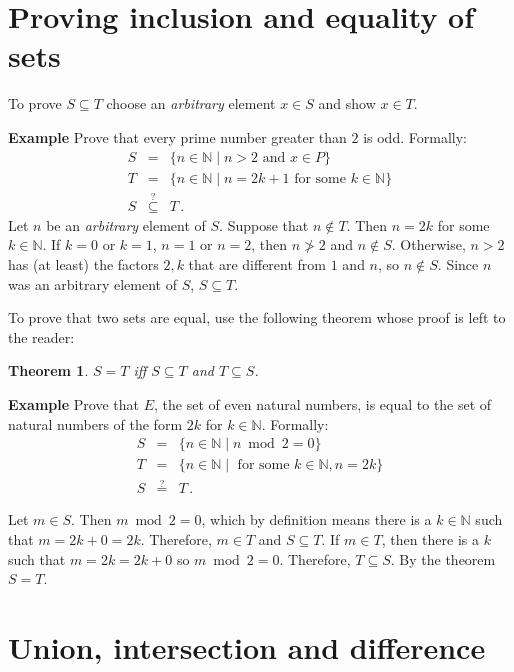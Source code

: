 \documentclass[12pt,a4paper]{article}
\newtheorem{theorem}{Theorem}
\newcommand*{\ind}{\hspace*{2em}}
\newenvironment{example}{\textbf{Example}}{}
\begin{document}
\section{Proving inclusion and equality of sets}

To prove $S\subseteq T$ choose an \emph{arbitrary} element $x\in S$
and show $x\in T$.

\begin{example}
Prove that every prime number greater than $2$ is odd. Formally:
\begin{eqnarray*}
S&=&\{n \in \mathbb{N} \mid n>2 \textrm{\ and \ } x\in P\}\\ 
T&=& \{n\in \mathbb{N} \mid n=2k+1 \textrm{\ for some \ } k\in \mathbb{N}\}\\
S&\stackrel{?}{\subseteq}& T\,.
\end{eqnarray*}
Let $n$ be an \emph{arbitrary} element of $S$. Suppose that $n\not\in T$. Then $n=2k$ for some $k\in \mathbb{N}$. If $k=0$ or $k=1$, $n=1$ or $n=2$, then $n\not>2$ and $n\not\in S$. Otherwise, $n>2$ has (at least) the factors $2,k$ that are different from $1$ and $n$, so $n\not \in S$. Since $n$ was an arbitrary element of $S$, $S\subseteq T$.
\end{example}

To prove that two sets are equal, use the following theorem whose proof is left to the reader:
\begin{theorem}\label{thm.setsequal}
\ind $S=T$ iff $S\subseteq T$ and $T\subseteq S$.
\end{theorem}

\begin{example}
Prove that $E$, the set of even natural numbers, is equal to the set of natural numbers of the form $2k$ for $k\in\mathbb{N}$. Formally:
\begin{eqnarray*}
S&=&\{n\in \mathbb{N} \mid  n \bmod 2 = 0\}\\
T&=&\{n\in \mathbb{N} \mid \textrm{\ for some\ } k\in \mathbb{N}, n=2k\}\\
S&\stackrel{?}{=}&T\,.
\end{eqnarray*}

Let $m\in S$. Then $m\bmod 2 = 0$, which by definition means there is a $k\in \mathbb{N}$ such that $m=2k+0=2k$. Therefore, $m\in T$ and $S\subseteq T$. If $m\in T$, then there is a $k$ such that $m=2k=2k+0$ so $m\bmod 2=0$. Therefore, $T\subseteq S$. By the theorem $S=T$.
\end{example}

\section{Union, intersection and difference}
\end{document}
